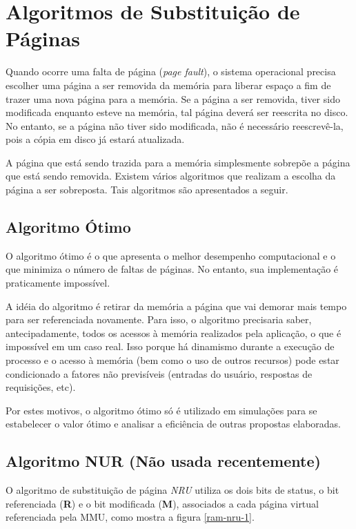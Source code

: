 \section{Algoritmos de Substituição de Páginas}\label{sec:algpag}

Quando ocorre uma falta de página (\textit{page fault}), o sistema operacional precisa escolher uma página a ser removida da memória para liberar espaço a fim de trazer uma nova página para a memória. Se a página a ser removida, tiver sido modificada enquanto esteve na memória, tal página deverá ser reescrita no disco. No entanto, se a página não tiver sido modificada, não é necessário reescrevê-la, pois a cópia em disco já estará atualizada.

A página que está sendo trazida para a memória simplesmente sobrepõe a página que está sendo removida. Existem vários algoritmos que realizam a escolha da página a ser sobreposta. Tais algoritmos são apresentados a seguir.

\subsection{Algoritmo Ótimo}

O algoritmo ótimo é o que apresenta o melhor desempenho computacional e o que minimiza o número de faltas de páginas. No entanto, sua implementação é praticamente impossível.

A idéia do algoritmo é retirar da memória a página que vai demorar mais tempo para ser referenciada novamente. Para isso, o algoritmo precisaria saber, antecipadamente, todos os acessos à memória realizados pela aplicação, o que é impossível em um caso real. Isso porque há dinamismo durante a execução de processo e o acesso à memória (bem como o uso de outros recursos) pode estar condicionado a fatores não previsíveis (entradas do usuário, respostas de requisições, etc).

Por estes motivos, o algoritmo ótimo só é utilizado em simulações para se estabelecer o valor ótimo e analisar a eficiência de outras propostas elaboradas.

\subsection{Algoritmo NUR (Não usada recentemente)}

O algoritmo de substituição de página \textit{NRU} utiliza os dois bits de status, o bit referenciada (\textbf{R}) e o bit modificada (\textbf{M}), associados a cada página virtual referenciada pela MMU, como mostra a figura \ref{ram-nru-1}. 

